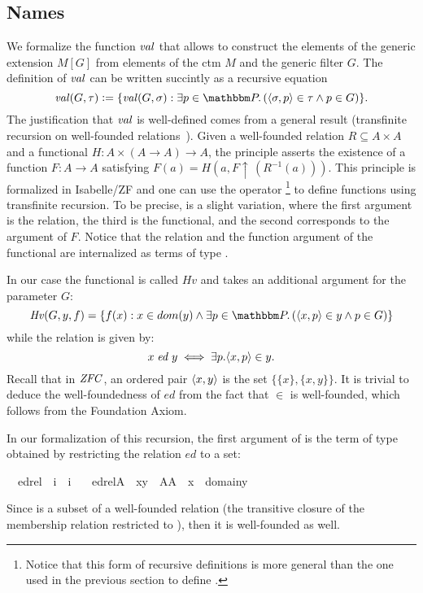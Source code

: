 \subsection{Names}
\label{sec:names}
We formalize the function $\operatorname{\mathit{val}}$ that allows to
construct the elements of the generic extension $M[G]$ from elements
of the ctm $M$ and the generic filter $G$. The definition of $\operatorname{\mathit{val}}$
can be written succintly as a recursive equation
%
\begin{equation}\label{eq:def-val}
\val(G,\tau)\defi \{\val(G,\sigma) : \exists p\in \PP.\,
(\lb\sigma,p\rb\in\tau \y p\in G)\}.
\end{equation}
%
The justification that $\operatorname{\mathit{val}}$ is well-defined comes from a general
result (transfinite recursion on well-founded
relations~\cite[p. 48]{kunen2011set}). Given a well-founded relation
$R \subseteq A \times A$ and a functional
$H : A \times (A \to A) \to A$, the principle asserts the existence of
a function $F : A \to A$ satisfying
$F(a) = H(a,F\uparrow\,(R^{-1}(a)))$. This principle is formalized in
Isabelle/ZF and one can use the operator \footnote{Notice
  that this form of recursive definitions is more general than the one
  used in the previous section to define
  .} to define functions using
transfinite recursion. To be precise,  is a slight variation, where the first argument is the
relation, the third is the functional, and the second corresponds to
the argument of $F$. Notice that the relation and the function argument
of the functional are internalized as terms of type .

In our case the functional is called $Hv$ and takes an additional argument for the
parameter $G$:
\[
  \mathit{Hv}(G,y,f) = \{f(x) : x \in dom(y) \y \exists p\in \PP.\,
(\lb x,p\rb\in y \y p\in G)\}
\]
while the relation is given by:
\[
x \mathrel{\mathit{ed}} y \iff \exists p . \langle x,p\rangle\in y.
\]
Recall that in $\mathit{ZFC}$, an ordered pair $\langle x,y \rangle$ is the set
$\{\{x\},\{x,y\}\}$. It is trivial to deduce the well-foundedness of
$\mathit{ed}$ from the fact that $\in$ is well-founded, which follows
from the Foundation Axiom.

In our formalization of this recursion,  the first argument of
 is the term of type   obtained by restricting the
relation $\mathit{ed}$ to  a set:
% 
\begin{isabelle}
\isamarkupfalse%
\isanewline
\ \ edrel\ {\isacharcolon}{\isacharcolon}\ {\isachardoublequoteopen}i\ {\isasymRightarrow}\ i{\isachardoublequoteclose}\ \isanewline
\ \ {\isachardoublequoteopen}edrel{\isacharparenleft}A{\isacharparenright}\ {\isacharequal}{\isacharequal}\ {\isacharbraceleft}{\isacharless}x{\isacharcomma}y{\isachargreater}\ {\isasymin}\ A{\isacharasterisk}A\ {\isachardot}\ x\ {\isasymin}\ domain{\isacharparenleft}y{\isacharparenright}{\isacharbraceright}{\isachardoublequoteclose}
\end{isabelle}
%
Since  is a subset of a  well-founded relation (the
transitive closure of the membership relation restricted to ),
then it is well-founded as well.

